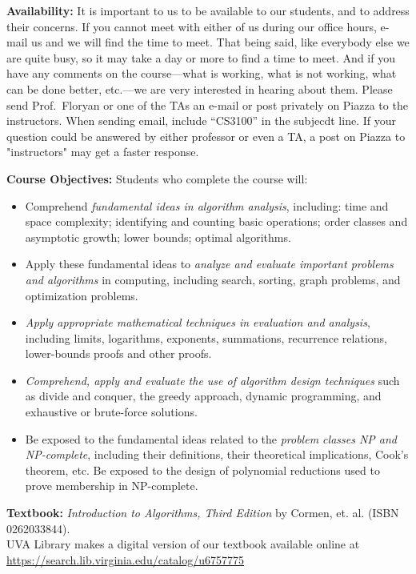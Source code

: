 \documentclass[12pt]{article}
\begin{document}
\textbf{Availability:} It is important to us to be available to our students, and to address their concerns.  If you cannot meet with either of us during our office hours, e-mail us and we will find the time to meet. That being said, like everybody else we are quite busy, so it may take a day or more to find a time to meet. And if you have any comments on the course---what is working, what is not working, what can be done better, etc.---we are very interested in hearing about them.  Please send Prof.\ Floryan or one of the TAs an e-mail or post privately on Piazza to the instructors.  When sending email, include ``CS3100'' in the subjecdt line. If your question could be answered by either professor or even a TA, a post on Piazza to "instructors" may get a faster response.


\textbf{Course Objectives:} Students who complete the course will:
\begin{itemize}
    \item Comprehend \textit{fundamental ideas in algorithm analysis}, including: time and space complexity; identifying and counting basic operations; order classes and asymptotic growth; lower bounds; optimal algorithms. 
    \item Apply these fundamental ideas to \textit{analyze and evaluate important problems and algorithms} in computing, including search, sorting, graph problems, and optimization problems.
    \item \textit{Apply appropriate mathematical techniques in evaluation and analysis}, including limits, logarithms, exponents, summations, recurrence relations, lower-bounds proofs and other proofs.
    \item \textit{Comprehend, apply and evaluate the use of algorithm design techniques} such as divide and conquer, the greedy approach, dynamic programming, and exhaustive or brute-force solutions.
    \item Be exposed to the fundamental ideas related to the \textit{problem classes NP and NP-complete}, including their definitions, their theoretical implications, Cook's theorem, etc. Be exposed to the design of polynomial reductions used to prove membership in NP-complete.
\end{itemize}

\textbf{Textbook:} \textit{Introduction to Algorithms, Third Edition} by Cormen, et. al. (ISBN 0262033844).\\
UVA Library makes a digital version of our textbook available online at\\\url{https://search.lib.virginia.edu/catalog/u6757775}\\
\end{document}
